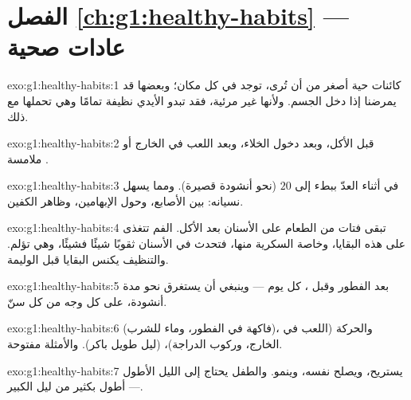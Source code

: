 \section*{الفصل \ref{ch:g1:healthy-habits} --- عادات صحية}

\begin{solution}{exo:g1:healthy-habits:1}
 كائنات حية أصغر من أن تُرى، توجد في كل مكان؛ وبعضها قد
يمرضنا إذا دخل الجسم. ولأنها غير مرئية، فقد تبدو الأيدي نظيفة
تمامًا وهي تحملها مع ذلك.
\end{solution}

\begin{solution}{exo:g1:healthy-habits:2}
قبل الأكل، وبعد دخول الخلاء، وبعد اللعب في الخارج أو ملامسة
.
\end{solution}

\begin{solution}{exo:g1:healthy-habits:3}
في أثناء العدّ ببطء إلى $20$ (نحو أنشودة قصيرة). ومما يسهل نسيانه:
بين الأصابع، وحول الإبهامين، وظاهر الكفين.
\end{solution}

\begin{solution}{exo:g1:healthy-habits:4}
تبقى فتات من الطعام على الأسنان بعد الأكل.  الفم تتغذى على
هذه البقايا، وخاصة السكرية منها، فتحدث في الأسنان ثقوبًا شيئًا
فشيئًا، وهي تؤلم. والتنظيف يكنس البقايا قبل الوليمة.
\end{solution}

\begin{solution}{exo:g1:healthy-habits:5}
بعد الفطور وقبل ، كل يوم --- وينبغي أن يستغرق نحو مدة
أنشودة، على كل وجه من كل سنّ.
\end{solution}

\begin{solution}{exo:g1:healthy-habits:6}
 (فاكهة في الفطور، وماء للشرب)، والحركة (اللعب في
الخارج، وركوب الدراجة)،  (ليل طويل  باكر). والأمثلة
مفتوحة.
\end{solution}

\begin{solution}{exo:g1:healthy-habits:7}
يستريح، ويصلح نفسه، وينمو. والطفل يحتاج إلى الليل الأطول ---
أطول بكثير من ليل الكبير.
\end{solution}

